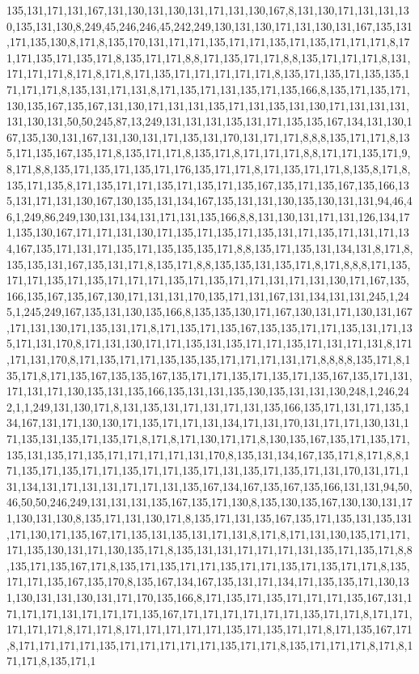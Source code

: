 135,131,171,131,167,131,130,131,130,131,171,131,130,167,8,131,130,171,131,131,130,135,131,130,8,249,45,246,246,45,242,249,130,131,130,171,131,130,131,167,135,131,171,135,130,8,171,8,135,170,131,171,171,135,171,171,135,171,135,171,171,171,8,171,171,135,171,135,171,8,135,171,171,8,8,171,135,171,171,8,8,135,171,171,171,8,131,171,171,171,8,171,8,171,8,171,135,171,171,171,171,171,8,135,171,135,171,135,135,171,171,171,8,135,131,171,131,8,171,135,171,131,135,171,135,166,8,135,171,135,171,130,135,167,135,167,131,130,171,131,131,135,171,131,135,131,130,171,131,131,131,131,130,131,50,50,245,87,13,249,131,131,131,135,131,171,135,135,167,134,131,130,167,135,130,131,167,131,130,131,171,135,131,170,131,171,171,8,8,8,135,171,171,8,135,171,135,167,135,171,8,135,171,171,8,135,171,8,171,171,171,8,8,171,171,135,171,9,8,171,8,8,135,171,135,171,135,171,176,135,171,171,8,171,135,171,171,8,135,8,171,8,135,171,135,8,171,135,171,171,135,171,135,171,135,167,135,171,135,167,135,166,135,131,171,131,130,167,130,135,131,134,167,135,131,131,130,135,130,131,131,94,46,46,1,249,86,249,130,131,134,131,171,131,135,166,8,8,131,130,131,171,131,126,134,171,135,130,167,171,171,131,130,171,135,171,135,171,135,131,171,135,171,131,171,134,167,135,171,131,171,135,171,135,135,135,171,8,8,135,171,135,131,134,131,8,171,8,135,135,131,167,135,131,171,8,135,171,8,8,135,135,131,135,171,8,171,8,8,8,171,135,171,171,135,171,135,171,171,171,135,171,135,171,171,131,171,131,130,171,167,135,166,135,167,135,167,130,171,131,131,170,135,171,131,167,131,134,131,131,245,1,245,1,245,249,167,135,131,130,135,166,8,135,135,130,171,167,130,131,171,130,131,167,171,131,130,171,135,131,171,8,171,135,171,135,167,135,135,171,171,135,131,171,135,171,131,170,8,171,131,130,171,171,135,131,135,171,171,135,171,131,171,131,8,171,171,131,170,8,171,135,171,171,135,135,135,171,171,171,131,171,8,8,8,8,135,171,8,135,171,8,171,135,167,135,135,167,135,171,171,135,171,135,171,135,167,135,171,131,171,131,171,130,135,131,135,166,135,131,131,135,130,135,131,131,130,248,1,246,242,1,1,249,131,130,171,8,131,135,131,171,131,171,131,135,166,135,171,131,171,135,134,167,131,171,130,130,171,135,171,171,131,134,171,131,170,131,171,171,130,131,171,135,131,135,171,135,171,8,171,8,171,130,171,171,8,130,135,167,135,171,135,171,135,131,135,171,135,171,171,171,171,131,170,8,135,131,134,167,135,171,8,171,8,8,171,135,171,135,171,171,135,171,171,135,171,131,135,171,135,171,131,170,131,171,131,134,131,171,131,131,171,171,131,135,167,134,167,135,167,135,166,131,131,94,50,46,50,50,246,249,131,131,131,135,167,135,171,130,8,135,130,135,167,130,130,131,171,130,131,130,8,135,171,131,130,171,8,135,171,131,135,167,135,171,135,131,135,131,171,130,171,135,167,171,135,131,135,131,171,131,8,171,8,171,131,130,135,171,171,171,135,130,131,171,130,135,171,8,135,131,131,171,171,171,131,135,171,135,171,8,8,135,171,135,167,171,8,135,171,135,171,171,135,171,171,135,171,135,171,171,8,135,171,171,135,167,135,170,8,135,167,134,167,135,131,171,134,171,135,135,171,130,131,130,131,131,130,131,171,170,135,166,8,171,135,171,135,171,171,171,135,167,131,171,171,171,131,171,171,171,135,167,171,171,171,171,171,171,135,171,171,8,171,171,171,171,171,8,171,171,8,171,171,171,171,171,135,171,135,171,171,8,171,135,167,171,8,171,171,171,171,135,171,171,171,171,171,135,171,171,8,135,171,171,171,8,171,8,171,171,8,135,171,1